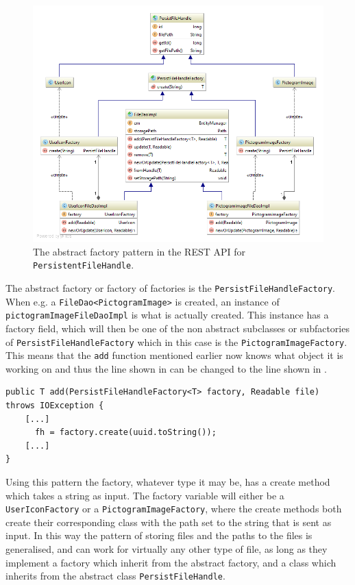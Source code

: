 \begin{figure}[h]
    \centering
    \includegraphics[width=\textwidth]{figures/diagram-factory.png}
    \caption{The abstract factory pattern in the REST API for \texttt{PersistentFileHandle}.}\label{fig:asbtractFactory}
\end{figure}

The abstract factory or factory of factories is the \texttt{PersistFileHandleFactory}.
When e.g. a \texttt{FileDao<PictogramImage>} is created, an instance of \texttt{pictogramImageFileDaoImpl} is what is actually created.
This instance has a factory field, which will then be one of the non abstract subclasses or subfactories of \texttt{PersistFileHandleFactory} which in this case is the \texttt{PictogramImageFactory}.
This means that the \texttt{add} function mentioned earlier now knows what object it is working on and thus the line shown in  can be changed to the line shown in .

\begin{lstlisting}[float, floatplacement=h, caption={Trying to use a Type Parameter constructor, which Java cannot do. \texttt{[...]} denotes omitted code.},label={lst:TypeParameterConstructorActual}]
public T add(PersistFileHandleFactory<T> factory, Readable file) throws IOException {
    [...]
      fh = factory.create(uuid.toString());
    [...]
}
\end{lstlisting}

Using this pattern the factory, whatever type it may be, has a create method which takes a string as input.
The factory variable will either be a \texttt{UserIconFactory} or a \texttt{PictogramImageFactory}, where the create methods both create their corresponding class with the path set to the string that is sent as input.
In this way the pattern of storing files and the paths to the files is generalised, and can work for virtually any other type of file, as long as they implement a factory which inherit from the abstract factory, and a class which inherits from the abstract class \texttt{PersistFileHandle}.

